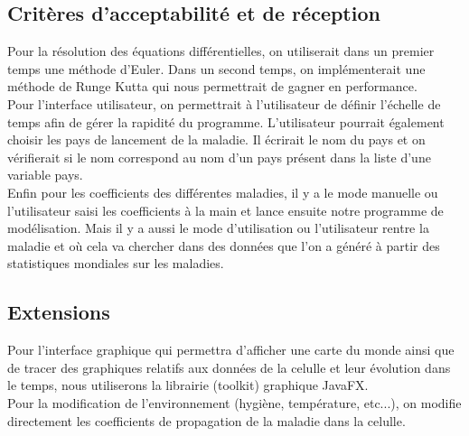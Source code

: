 \documentclass[12pt,a4paper]{report}
\begin{document}
\subsection*{Critères d'acceptabilité et de réception}
\begin{flushleft}
	Pour la résolution des équations différentielles, on utiliserait dans un premier temps une méthode d'Euler. Dans un second temps, on implémenterait une méthode de Runge Kutta qui nous permettrait de gagner en performance. \\
	Pour l'interface utilisateur, on permettrait à l'utilisateur de définir l'échelle de temps afin de gérer la rapidité du programme. L'utilisateur pourrait également choisir les pays de lancement de la maladie. Il écrirait le nom du pays et on vérifierait si le nom correspond au nom d'un pays présent dans la liste d'une variable pays. \\
	Enfin pour les coefficients des différentes maladies, il y a le mode manuelle ou l'utilisateur saisi les coefficients à la main et lance ensuite notre programme de modélisation. Mais il y a aussi le mode d'utilisation ou l'utilisateur rentre la maladie et où cela va chercher dans des données que l'on a généré à partir des statistiques mondiales sur les maladies.
\end{flushleft}

\subsection*{Extensions}
\begin{flushleft}
 	Pour l'interface graphique qui permettra d'afficher une carte du monde ainsi que de tracer des graphiques relatifs aux données de la celulle et leur évolution dans le temps, nous utiliserons la librairie (toolkit) graphique JavaFX. \\
	Pour la modification de l'environnement (hygiène, température, etc...), on modifie directement les coefficients de propagation de la maladie dans la celulle.
\end{flushleft}
\end{document}
